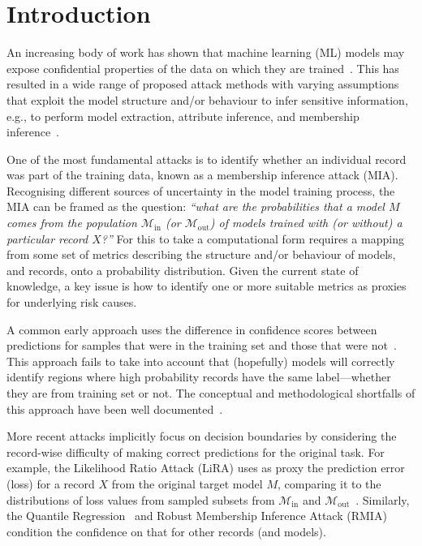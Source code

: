 \section{Introduction}%
\label{sec:introduction}

An increasing body of work has shown that machine learning (ML) models may expose confidential properties of the data on which they are trained~\cite{Hu:2022}. This has resulted in a wide range of proposed attack methods with varying assumptions that exploit the model structure and/or behaviour to infer sensitive information, e.g., to perform model extraction, attribute inference, and membership inference~\cite{Rigaki:2023, Jegorova:2023}.

One of the most fundamental attacks is to identify whether an individual record was part of the training data, known as a membership inference attack (MIA). Recognising different sources of uncertainty in the model training process, the MIA can be framed as the question: \textit{``what are the probabilities that a model $M$ comes from the population $\mathcal{M}_{\text{in}}$ (or $\mathcal{M}_{\text{out}}$) of models trained with (or without) a particular record $X$?''} For this to take a computational form requires a mapping from some set of metrics describing the structure and/or behaviour of models, and records, onto a probability distribution. Given the current state of knowledge, a key issue is how to identify one or more suitable metrics as proxies for underlying risk causes.

A common early approach uses the difference in confidence scores between predictions for samples that were in the training set and those that were not~\cite{Shokri:2017}. This approach fails to take into account that (hopefully) models will correctly identify regions where high probability records have the same label---whether they are from training set or not. The conceptual and methodological shortfalls of this approach have been well documented~\cite{Rezaie:2021}. 

More recent attacks implicitly focus on decision boundaries by considering the record-wise difficulty of making correct predictions for the original task. For example, the Likelihood Ratio Attack (LiRA) uses as proxy the prediction error (loss) for a record $X$ from the original target model $M$, comparing it to the distributions of loss values from sampled subsets from $\mathcal{M}_{\text{in}}$ and $\mathcal{M}_{\text{out}}$~\cite{Carlini:2022}. Similarly, the Quantile Regression~\cite{Bertran:2023} and Robust Membership Inference Attack (RMIA)~\cite{Zarifzadeh:2024} condition the confidence on that for other records (and models). 


